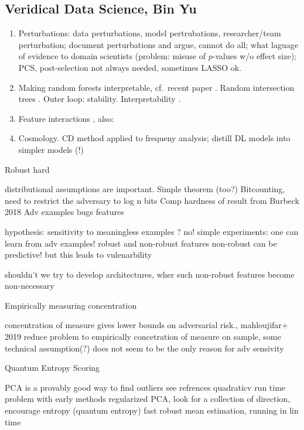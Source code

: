 \documentclass[12pt,a4paper]{article}
\begin{document}
\subsection{Veridical Data Science, Bin Yu}

\begin{enumerate}
\item Perturbations: data perturbations, model pertrubations, researcher/team perturbation; document perturbations and argue, cannot do all; what laguage of evidence to domain scientists (problem: misuse of $p$-values w/o effect size); PCS, post-selection not always needed, sometimes LASSO ok.
\item Making random forests interpretable, cf.~recent paper \cite{basu2018iterative}. Random intersection trees \cite{shah2014random}. Outer loop: stability. Interpretability \cite{murdoch2019interpretable}.
\item Feature interactions \cite{murdoch2018beyond}, also: \cite{rieger2019interpretations}
\item Cosmology. CD method applied to frequeny analysis; distill DL models into simpler models (!)
\end{enumerate}


Robust hard 

distributional assumptions are important. Simple theorem (too?)
Bitcounting, need to restrict the adversary to log n bits 
Comp hardness of result from Burbeck 2018
Adv examples bugs features 

hypothesis: sensitivity to meaningless examples ? no!
simple experiments: one can learn from adv examples!
robust and non-robust features 
non-robust can be predictive! but this leads to vulenarbility 

shouldn't we try to develop architectures, wher such non-robust features become non-necessary 

Empirically measuring concentration 

concentration of measure gives lower bounds on adversarial risk., mahloujifar+ 2019
reduce problem to empirically concetration of measure on sample, some technical assumption(?) 
does not seem to be the only reason for adv sensivity 


Quantum Entropy Scoring 

PCA is a provably good way to find outliers  see refrences
quadraticv run time problem with early methods
regularized PCA, look for a collection of direction, encourage entropy (quantum entropy) 
fast robust mean estimation, running in lin time
\end{document}
